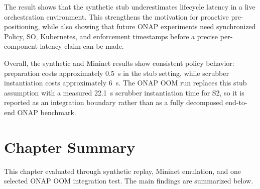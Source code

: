 The result shows that the synthetic stub underestimates lifecycle latency in a live orchestration environment. This strengthens the motivation for proactive
 pre-positioning, while also showing that future ONAP experiments need synchronized Policy, SO, Kubernetes, and enforcement timestamps before a precise per-component latency claim can be made.

Overall, the synthetic and Mininet results show consistent policy behavior:  preparation costs approximately 0.5~s in the stub setting, while  scrubber instantiation costs approximately 6~s. The ONAP OOM run replaces this stub assumption with a measured 22.1~s scrubber instantiation time for S2, so it is reported as an integration boundary rather than as a fully decomposed end-to-end ONAP benchmark.
\section{Chapter Summary}
\label{sec:eval-summary}

This chapter evaluated \padonap{} through synthetic replay, Mininet emulation, and one selected ONAP OOM integration test. The main findings are summarized below.

